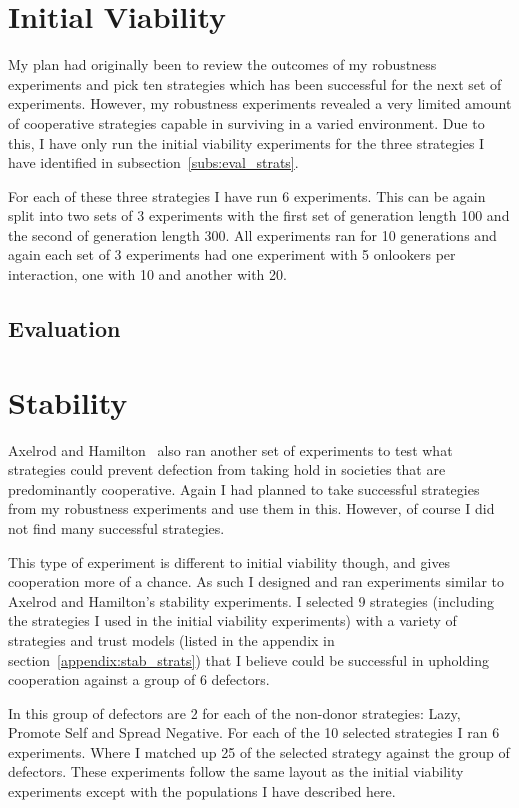 \documentclass[]{final_report}
\begin{document}
\section{Initial Viability}
My plan had originally been to review the outcomes of my robustness experiments and pick ten strategies which has been successful for the next set of experiments. However, my robustness experiments revealed a very limited amount of cooperative strategies capable in surviving in a varied environment. Due to this, I have only run the initial viability experiments for the three strategies I have identified in subsection~\ref{subs:eval_strats}.\par 
For each of these three strategies I have run 6 experiments. This can be again split into two sets of 3 experiments with the first set of generation length 100 and the second of generation length 300. All experiments ran for 10 generations and again each set of 3 experiments had one experiment with 5 onlookers per interaction, one with 10 and another with 20.

\subsection{Evaluation}

\section{Stability}
Axelrod and Hamilton~\cite{evolution_of_cooperation} also ran another set of experiments to test what strategies could prevent defection from taking hold in societies that are predominantly cooperative. Again I had planned to take successful strategies from my robustness experiments and use them in this. However, of course I did not find many successful strategies.\par 
This type of experiment is different to initial viability though, and gives cooperation more of a chance. As such I designed and ran experiments similar to Axelrod and Hamilton's stability experiments. I selected 9 strategies (including the strategies I used in the initial viability experiments) with a variety of strategies and trust models (listed in the appendix in section~\ref{appendix:stab_strats}) that I believe could be successful in upholding cooperation against a group of 6 defectors.\par 
In this group of defectors are 2 for each of the non-donor strategies: Lazy, Promote Self and Spread Negative. For each of the 10 selected strategies I ran 6 experiments. Where I matched up 25 of the selected strategy against the group of defectors. These experiments follow the same layout as the initial viability experiments except with the populations I have described here.
\end{document}
